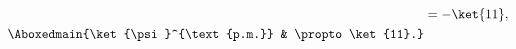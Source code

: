 \documentclass[./../main.tex]{subfiles}
\begin{document}
\begin{enumerate}
\begin{align*}
		                                           & = -\ket{11},                                                                                                                                                                                                                                                                                                                                                                                                                                                                                    \\
		      \Aboxedmain{\ket{\psi}^{\text{p.m.}} & \propto \ket{11}.}
	      \end{align*}
\end{enumerate}
\end{document}
